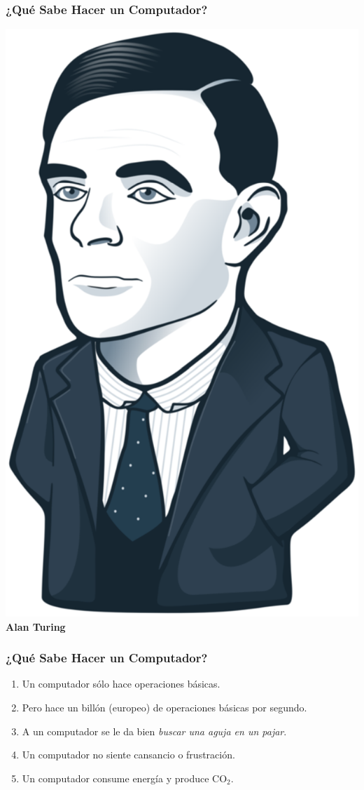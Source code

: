 \documentclass[a4paper,t,xcolor=pst,dvips,colortheme]{beamer}
\begin{document}
\begin{frame}[c]
    \frametitle{¿Qué Sabe Hacer un Computador?}
    \begin{center}
       \includegraphics[width=0.5\linewidth]{images/intro/alanTuring.eps} \\ 
        \textbf{Alan Turing}
    \end{center}
    

    
\end{frame}

\begin{frame}[c]
    \frametitle{¿Qué Sabe Hacer un Computador?}
    \begin{enumerate}[<+->]
        \item Un computador sólo hace operaciones básicas.
        \item Pero hace un billón (europeo) de operaciones básicas por segundo.
        \item A un computador se le da bien \emph{buscar una aguja en un pajar}.
        \item Un computador no siente cansancio o frustración.
        \item Un computador consume energía y produce CO$_{2}$.
    \end{enumerate}
\end{frame}
\end{document}
